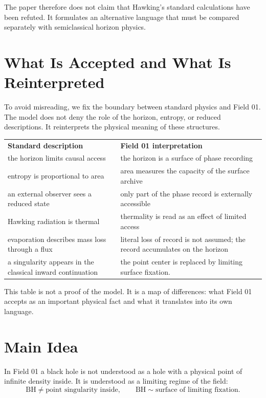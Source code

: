 \documentclass[11pt,a4paper]{article}
\begin{document}
The paper therefore does not claim that Hawking's standard calculations have been refuted. It formulates an alternative language that must be compared separately with semiclassical horizon physics.

\section{What Is Accepted and What Is Reinterpreted}

To avoid misreading, we fix the boundary between standard physics and Field 01. The model does not deny the role of the horizon, entropy, or reduced descriptions. It reinterprets the physical meaning of these structures.

\begin{center}
\begin{tabular}{p{}p{}}
\textbf{Standard description} & \textbf{Field 01 interpretation} \\
the horizon limits causal access & the horizon is a surface of phase recording \\
entropy is proportional to area & area measures the capacity of the surface archive \\
an external observer sees a reduced state & only part of the phase record is externally accessible \\
Hawking radiation is thermal & thermality is read as an effect of limited access \\
evaporation describes mass loss through a flux & literal loss of record is not assumed; the record accumulates on the horizon \\
a singularity appears in the classical inward continuation & the point center is replaced by limiting surface fixation.
\end{tabular}
\end{center}

This table is not a proof of the model. It is a map of differences: what Field 01 accepts as an important physical fact and what it translates into its own language.

\section{Main Idea}

In Field 01 a black hole is not understood as a hole with a physical point of infinite density inside. It is understood as a limiting regime of the field:
\begin{equation}
\text{BH} \neq \text{point singularity inside},
\qquad
\text{BH} \sim \text{surface of limiting fixation}.
\end{equation}
\end{document}
